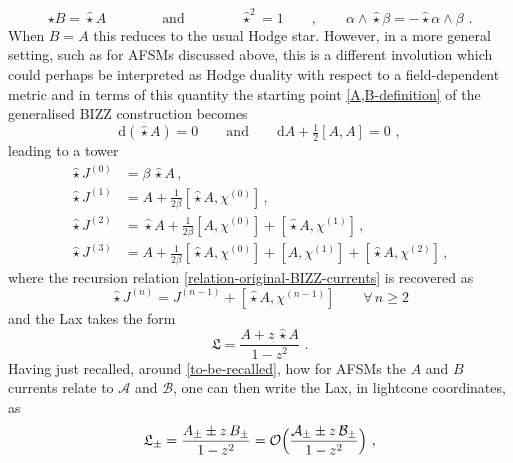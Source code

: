 \documentclass[12pt]{article}
\numberwithin{equation}{section}
\begin{document}
\begin{equation}\label{modified-Hodge-def}
\star B = \hat{\star} A
\qquad \qquad \text{and} \qquad \qquad  \hat{\star}^2=1
\qquad , \qquad 
\alpha \wedge \hat{\star}\beta = -\hat{\star}\alpha \wedge \beta\,\, .
\end{equation}
When $B=A$ this reduces to the usual Hodge star. However, in a more general setting, such as for AFSMs discussed above, this is a different involution which could perhaps be interpreted as Hodge duality with respect to a field-dependent metric and in terms of this quantity the starting point \eqref{A,B-definition} of the generalised BIZZ construction becomes
\begin{equation}
\mathrm{d}(\hat{\star}A)=0
\qquad \text{and} \qquad 
\mathrm{d}A+\tfrac{1}{2}[A,A]=0 \,\, ,
\end{equation}
leading to a tower
\begin{equation}
\begin{aligned}
\hat{\star} J^{(0)}&=\beta \, \hat{\star} A \, ,
\\
\hat{\star} J^{(1)}&=  A + \tfrac{1}{2\beta}[\hat{\star} A,\chi^{(0)}] \, ,
\\
\hat{\star} J^{(2)}&=\hat{\star} A+\tfrac{1}{2\beta}[ A,\chi^{(0)}]+[\hat{\star} A,\chi^{(1)}] \, ,
\\
\hat{\star} J^{(3)}&= A + \tfrac{1}{2\beta}[\hat{\star} A,\chi^{(0)}]+[ A,\chi^{(1)}]+[\hat{\star} A ,\chi^{(2)}] \, ,
\end{aligned}
\end{equation}
where the recursion relation \eqref{relation-original-BIZZ-currents} is recovered as 
\begin{equation}\label{modified-Hodge-BIZZ-currents-rule}
\hat{\star} J^{(n)}=J^{(n-1)}+[\hat{\star} A,\chi^{(n-1)}] \qquad \forall \, n\geq 2 
\end{equation}
and the Lax takes the form
\begin{equation}
\mathfrak{L}=\frac{A+z\, \hat{\star}A}{1-z^2} \,\, .
\end{equation}
Having just recalled, around \eqref{to-be-recalled}, how for AFSMs the $A$ and $B$ currents relate to $\mathcal{A}$ and $\mathcal{B}$, one can then write the Lax, in lightcone coordinates, as
\begin{equation}
\mathfrak{L}_{\pm}=\frac{A_{\pm}\pm z \, B_{\pm}}{1-z^2}=\mathcal{O}\Bigl( \frac{\mathcal{A}_{\pm}\pm z \, \mathcal{B}_{\pm}}{1-z^2} \Bigr) \,\, ,
\end{equation}
\end{document}
